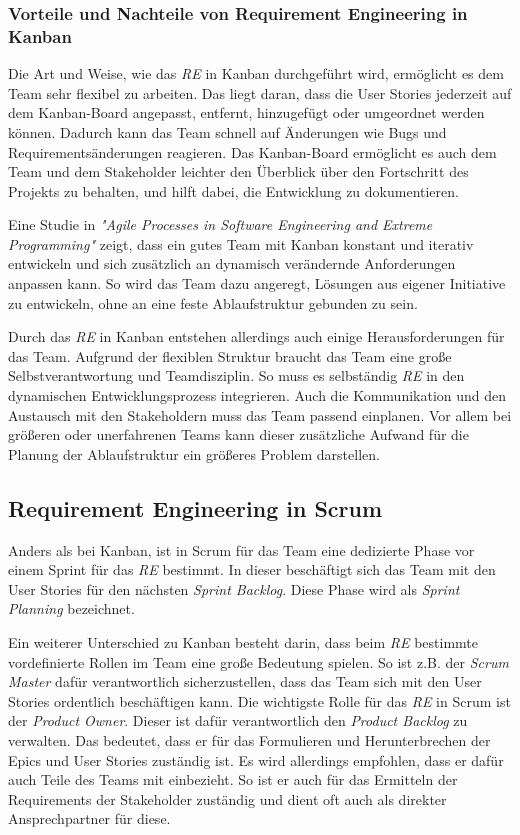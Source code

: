 \documentclass[acmtog]{acmart}
\begin{document}
\subsubsection{Vorteile und Nachteile von Requirement Engineering in Kanban}

Die Art und Weise, wie das \emph{RE} in Kanban durchgeführt wird, ermöglicht es dem Team sehr flexibel zu arbeiten. 
Das liegt daran, dass die User Stories jederzeit auf dem Kanban-Board angepasst, entfernt, 
hinzugefügt oder umgeordnet werden können. Dadurch kann das Team schnell auf Änderungen wie Bugs und Requirementsänderungen 
reagieren. Das Kanban-Board ermöglicht es auch dem Team und dem Stakeholder leichter den Überblick über den 
Fortschritt des Projekts zu behalten, und hilft dabei, die Entwicklung zu dokumentieren.

Eine Studie in \emph{"Agile Processes in Software Engineering and Extreme Programming"} \cite{agileprocesses} zeigt, dass ein gutes Team mit Kanban konstant und iterativ entwickeln und sich zusätzlich 
an dynamisch verändernde Anforderungen anpassen kann. So wird das Team dazu angeregt, Lösungen aus eigener 
Initiative zu entwickeln, ohne an eine feste Ablaufstruktur gebunden zu sein. \cite{reqkanban}

Durch das \emph{RE} in Kanban entstehen allerdings auch einige Herausforderungen für das Team. Aufgrund der flexiblen 
Struktur braucht das Team eine große Selbstverantwortung und Teamdisziplin. So muss es selbständig \emph{RE} in den 
dynamischen Entwicklungsprozess integrieren. Auch die Kommunikation und den Austausch mit den Stakeholdern muss 
das Team passend einplanen. Vor allem bei größeren oder unerfahrenen Teams kann dieser zusätzliche Aufwand für 
die Planung der Ablaufstruktur ein größeres Problem darstellen. \cite{kanbannod}

\subsection{Requirement Engineering in Scrum}

Anders als bei Kanban, ist in Scrum für das Team eine dedizierte Phase vor einem Sprint für das \emph{RE} bestimmt. In dieser 
beschäftigt sich das Team mit den User Stories für den nächsten \emph{Sprint Backlog}. Diese Phase wird als \emph{Sprint Planning} bezeichnet. \cite{reinscrum}

Ein weiterer Unterschied zu Kanban besteht darin, dass beim \emph{RE} bestimmte vordefinierte Rollen im Team eine 
große Bedeutung spielen. So ist z.B. der \emph{Scrum Master} dafür verantwortlich sicherzustellen, dass das Team sich mit den 
User Stories ordentlich beschäftigen kann. Die wichtigste Rolle für das \emph{RE} in Scrum ist der \emph{Product Owner}. Dieser ist 
dafür verantwortlich den \emph{Product Backlog} zu verwalten. Das bedeutet, dass er für das Formulieren und Herunterbrechen der 
Epics und User Stories zuständig ist. Es wird allerdings empfohlen, dass er dafür auch Teile des Teams mit einbezieht. So ist er auch für 
das Ermitteln der Requirements der Stakeholder zuständig und dient oft auch als direkter Ansprechpartner für diese. \cite{reinscrum}
\end{document}
